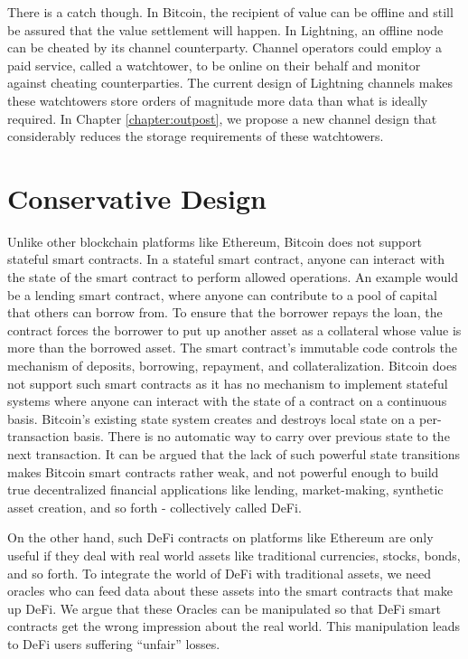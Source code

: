 There is a catch though. In Bitcoin, the recipient of value can be offline and still be assured that the value settlement will happen. In Lightning, an offline node can be cheated by its channel counterparty. Channel operators could employ a paid service, called a watchtower, to be online on their behalf and monitor against cheating counterparties. The current design of Lightning channels makes these watchtowers store orders of magnitude more data than what is ideally required. In Chapter \ref{chapter:outpost}, we propose a new channel design that considerably reduces the storage requirements of these watchtowers. 

\section{Conservative Design}
Unlike other blockchain platforms like Ethereum, Bitcoin does not support stateful smart contracts. In a stateful smart contract, anyone can interact with the state of the smart contract to perform allowed operations. An example would be a lending smart contract, where anyone can contribute to a pool of capital that others can borrow from. To ensure that the borrower repays the loan, the contract forces the borrower to put up another asset as a collateral whose value is more than the borrowed asset. The smart contract's immutable code controls the mechanism of deposits, borrowing, repayment, and collateralization. Bitcoin does not support such smart contracts as it has no mechanism to implement stateful systems where anyone can interact with the state of a contract on a continuous basis. Bitcoin's existing state system creates and destroys local state on a per-transaction basis. There is no automatic way to carry over previous state to the next transaction. It can be argued that the lack of such powerful state transitions makes Bitcoin smart contracts rather weak, and not powerful enough to build true decentralized financial applications like lending, market-making, synthetic asset creation, and so forth - collectively called DeFi.

On the other hand, such DeFi contracts on platforms like Ethereum are only useful if they deal with real world assets like traditional currencies, stocks, bonds, and so forth. To integrate the world of DeFi with traditional assets, we need oracles who can feed data about these assets into the smart contracts that make up DeFi. We argue that these Oracles can be manipulated so that DeFi smart contracts get the wrong impression about the real world. This manipulation leads to DeFi users suffering ``unfair'' losses. 

